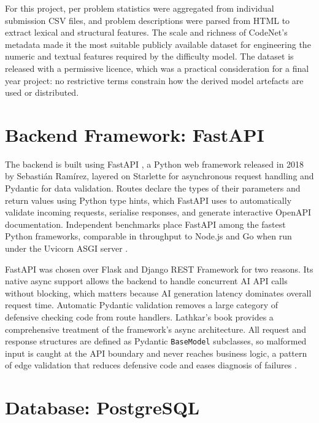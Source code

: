 For this project, per problem statistics were aggregated from
individual submission CSV files, and problem descriptions were parsed
from HTML to extract lexical and structural features. The scale and
richness of CodeNet's metadata made it the most suitable publicly
available dataset for engineering the numeric and textual features
required by the difficulty model. The dataset is released with a
permissive licence, which was a practical consideration for a final
year project: no restrictive terms constrain how the derived model
artefacts are used or distributed.

\section{Backend Framework: FastAPI}

The backend is built using FastAPI \cite{fastapi2025}, a Python web
framework released in 2018 by Sebasti\'{a}n Ram\'{i}rez, layered on
Starlette \cite{starlette2025} for asynchronous request handling and
Pydantic \cite{pydantic2025} for data validation. Routes declare the
types of their parameters and return values using Python type hints,
which FastAPI uses to automatically validate incoming requests,
serialise responses, and generate interactive OpenAPI documentation.
Independent benchmarks place FastAPI among the fastest Python
frameworks, comparable in throughput to Node.js and Go when run under
the Uvicorn ASGI server \cite{fastapi2025}.

FastAPI was chosen over Flask and Django REST Framework for two
reasons. Its native async support allows the backend to handle
concurrent AI API calls without blocking, which matters because AI
generation latency dominates overall request time. Automatic Pydantic
validation removes a large category of defensive checking code from
route handlers. Lathkar's book
\cite{lathkar2023} provides a comprehensive treatment of the
framework's async architecture. All request and response structures
are defined as Pydantic \texttt{BaseModel} subclasses, so malformed
input is caught at the API boundary and never reaches business logic,
a pattern of edge validation that reduces defensive code and eases
diagnosis of failures \cite{martin2008cleancode}.

\section{Database: PostgreSQL}

